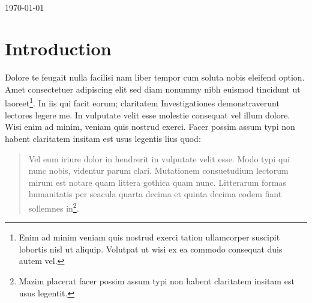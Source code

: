 \documentclass[a4paper,12pt]{scrartcl}
\begin{document}
\begin{titlepage}
\begin{small}
\vfill {\university\\ 
\faculty \\ 
\semester}
\end{small}


\begin{center}
\begin{Large}
\vfill {\textsf{\textbf{
\doctitle
}}}
\end{Large}
\end{center}

\begin{small}
\vfill 
	\authorFirstname \authorLastname \\ 
	\authorStreet \\  
	\authorCity \\  
	\authorEmail\\ 
	\today
\end{small}

\end{titlepage}



\tableofcontents
\thispagestyle{empty}

\clearpage

\onehalfspacing

\pagestyle{plain}


\section{Introduction}
Dolore te feugait nulla facilisi nam liber tempor cum soluta nobis eleifend option. Amet consectetuer adipiscing elit sed diam nonummy nibh euismod tincidunt ut laoreet\footnote{Enim ad minim veniam quis nostrud exerci tation ullamcorper suscipit lobortis nisl ut aliquip. Volutpat ut wisi ex ea commodo consequat duis autem vel. }. In iis qui facit eorum; claritatem Investigationes demonstraverunt lectores legere me. In vulputate velit esse molestie consequat vel illum dolore. Wisi enim ad minim, veniam quis nostrud exerci. Facer possim assum typi non habent claritatem insitam est usus legentis lius quod:

\begin{quote}
Vel eum iriure dolor in hendrerit in vulputate velit esse. Modo typi qui nunc nobis, videntur parum clari. Mutationem consuetudium lectorum mirum est notare quam littera gothica quam nunc. Litterarum formas humanitatis per seacula quarta decima et quinta decima eodem fiant sollemnes in\footnote{Mazim placerat facer possim assum typi non habent claritatem insitam est usus legentit.}.
\end{quote}
\end{document}
